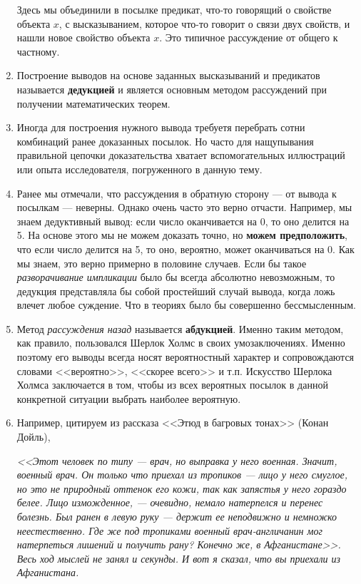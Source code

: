 \begin{enumerate}
Здесь мы объединили в посылке предикат, что-то говорящий о свойстве объекта $x$, с высказыванием, которое что-то говорит о связи двух свойств, и нашли новое свойство объекта $x$. Это типичное рассуждение от общего к частному.
\item Построение выводов на основе заданных высказываний и предикатов называется \textbf{дедукцией} и является основным методом рассуждений при получении математических теорем.
\item Иногда для построения нужного вывода требуетя перебрать сотни комбинаций ранее доказанных посылок. Но часто для нащупывания правильной цепочки доказательства хватает вспомогательных иллюстраций или опыта исследователя, погруженного в данную тему.
\item Ранее мы отмечали, что рассуждения в обратную сторону --- от вывода к посылкам --- неверны. Однако очень часто это верно отчасти. Например, мы знаем дедуктивный вывод: если число оканчивается на 0, то оно делится на 5. На основе этого мы не можем доказать точно, но \textbf{можем предположить}, что если число делится на 5, то оно, вероятно, может оканчиваться на 0. Как мы знаем, это верно примерно в половине случаев. Если бы такое \textit{разворачивание импликации} было бы всегда абсолютно невозможным, то дедукция представляла бы собой простейший случай вывода, когда ложь влечет любое суждение. Что в теориях было бы совершенно бессмысленным.
\item Метод \textit{рассуждения назад} называется \textbf{абдукцией}. Именно таким методом, как правило, пользовался Шерлок Холмс в своих умозаключениях. Именно поэтому его выводы всегда носят вероятностный характер и сопровождаются словами <<вероятно>>, <<скорее всего>> и т.п. Искусство Шерлока Холмса заключается в том, чтобы из всех вероятных посылок в данной конкретной ситуации выбрать наиболее вероятную.
\item Например, цитируем из рассказа <<Этюд в багровых тонах>> (Конан Дойль),

\textit{<<Этот человек по типу --- врач, но выправка у него военная. Значит, военный врач. Он только что приехал из тропиков --- лицо у него смуглое, но это не природный оттенок его кожи, так как запястья у него гораздо белее. Лицо изможденное, --- очевидно, немало натерпелся и перенес болезнь. Был ранен в левую руку --- держит ее неподвижно и немножко неестественно. Где же под тропиками военный врач-англичанин мог натерпеться лишений и получить рану? Конечно же, в Афганистане>>. Весь ход мыслей не занял и секунды. И вот я сказал, что вы приехали из Афганистана.}


\end{enumerate}
